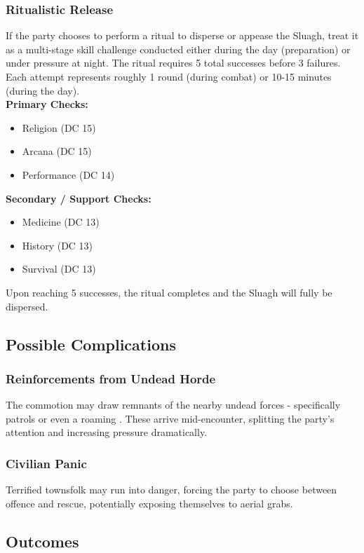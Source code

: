 \subsubsection*{Ritualistic Release}
{\entryfont If the party chooses to perform a ritual to disperse or appease the Sluagh, treat it as a multi-stage skill challenge conducted either during the day (preparation) or under pressure at night. The ritual requires 5 total successes before 3 failures. Each attempt represents roughly 1 round (during combat) or 10-15 minutes (during the day).\\
\textbf{Primary Checks:}
\begin{itemize}
	\item Religion (DC 15)
	\item Arcana (DC 15)
	\item Performance (DC 14)
\end{itemize}
\textbf{Secondary / Support Checks:}
\begin{itemize}
	\item Medicine (DC 13)
	\item History (DC 13)
	\item Survival (DC 13)
\end{itemize}
Upon reaching 5 successes, the ritual completes and the Sluagh will fully be dispersed.}

\subsection*{Possible Complications}
\subsubsection*{Reinforcements from Undead Horde}
{\entryfont The commotion may draw remnants of the nearby undead forces - specifically \hyperref[monster:UndeadSoldier]{} patrols or even a roaming \hyperref[monster:CorruptedUnicorn]{}. These arrive mid-encounter, splitting the party's attention and increasing pressure dramatically.}
\subsubsection*{Civilian Panic}
{\entryfont Terrified townsfolk may run into danger, forcing the party to choose between offence and rescue, potentially exposing themselves to aerial grabs.}

\subsection*{Outcomes}
